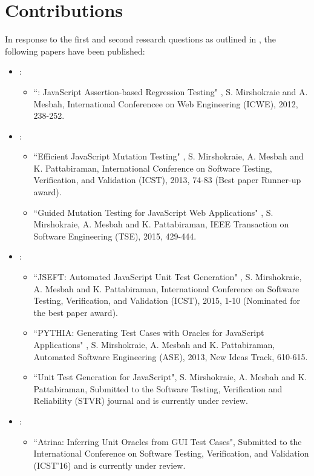 \section{Contributions} \label{Sec:contrib}
In response to the first and second research questions as outlined in , the following papers have been published:
\begin{itemize}
\item {}:
\begin{itemize}
\item ``\jsart: JavaScript Assertion-based Regression Testing" \cite{mirshokraie:icwe12},
S. Mirshokraie and A. Mesbah, International Conferencee on Web Engineering (ICWE), 2012, 238-252.
\end{itemize}
\item {}:
\begin{itemize}
\item ``Efficient JavaScript Mutation Testing" \cite{mirshokraie:icst13},
S. Mirshokraie, A. Mesbah and K. Pattabiraman, International Conference on Software Testing, Verification, and Validation (ICST), 2013, 74-83 (Best paper Runner-up award).
\item ``Guided Mutation Testing for JavaScript Web Applications" \cite{mirshokraie:tse15},
S. Mirshokraie, A. Mesbah and K. Pattabiraman, IEEE Transaction on Software Engineering (TSE), 2015, 429-444.
\end{itemize}
\item {}:
\begin{itemize}
\item ``JSEFT: Automated JavaScript Unit Test Generation" \cite{mirshokraie:icst15},
S. Mirshokraie, A. Mesbah and K. Pattabiraman, International Conference on Software Testing, Verification, and Validation (ICST), 2015, 1-10 (Nominated for the best paper award).
\item ``PY\-THIA: Generating Test Cases with Oracles
for JavaScript Applications" \cite{shabnam:ase13},
S. Mirshokraie, A. Mesbah and K. Pattabiraman, Automated Software Engineering (ASE), 2013, New Ideas Track, 610-615.
\item ``Unit Test Generation for JavaScript", S. Mirshokraie, A. Mesbah and K. Pattabiraman,
Submitted to the Software Testing, Verification and Reliability (STVR) journal and is currently under review. 
\end{itemize} 
\item {}:
\begin{itemize}
\item ``Atrina: Inferring Unit Oracles from GUI Test Cases",
Submitted to the International Conference on Software Testing, Verification, and Validation (ICST'16) and is currently under review.
\end{itemize}
\end{itemize}

